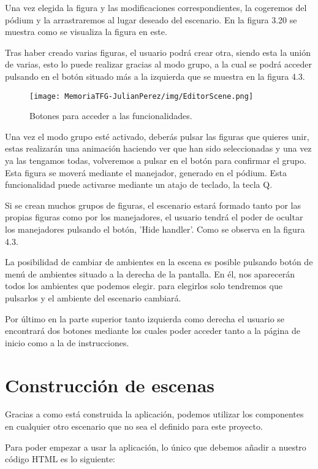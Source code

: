 \documentclass[a4paper, 12pt]{book}
\begin{document}
Una vez elegida la figura y las modificaciones correspondientes, la cogeremos del pódium y la arrastraremos al lugar deseado del escenario. En la figura 3.20 se muestra como se visualiza la figura en este.

Tras haber creado varias figuras, el usuario podrá crear otra, siendo esta la unión de varias, esto lo puede realizar gracias al modo grupo, a la cual se podrá acceder pulsando en el botón situado más a la izquierda que se muestra en la figura 4.3.
\begin{figure}[H]
  \centering
  \texttt{[image: MemoriaTFG-JulianPerez/img/EditorScene.png]}
  \caption{Botones para acceder a las funcionalidades.}\label{home}
\end{figure}

Una vez el modo grupo esté activado, deberás pulsar las figuras que quieres unir, estas realizarán una animación haciendo ver que han sido seleccionadas y una vez ya las tengamos todas, volveremos a pulsar en el botón para confirmar el grupo. Esta figura se moverá mediante el manejador, generado en el pódium. Esta funcionalidad puede activarse mediante un atajo de teclado, la tecla Q.

Si se crean muchos grupos de figuras, el escenario estará formado tanto por las propias figuras como por los manejadores, el usuario tendrá el poder de ocultar los manejadores pulsando el botón, 'Hide handler'. Como se observa en la figura 4.3.

La posibilidad de cambiar de ambientes en la escena es posible pulsando botón de menú de ambientes situado a la derecha de la pantalla. En él, nos aparecerán todos los ambientes que podemos elegir. para elegirlos solo tendremos que pulsarlos y el ambiente del escenario cambiará.

Por último en la parte superior tanto izquierda como derecha el usuario se encontrará dos botones mediante los cuales poder acceder tanto a la página de inicio como a la de instrucciones.

\section{Construcción de escenas}
\label{sec:Construcción de escenas}
Gracias a como está construida la aplicación, podemos utilizar los componentes en cualquier otro escenario que no sea el definido para este proyecto.

Para poder empezar a usar la aplicación, lo único que debemos añadir a nuestro código HTML es lo siguiente:
\end{document}
